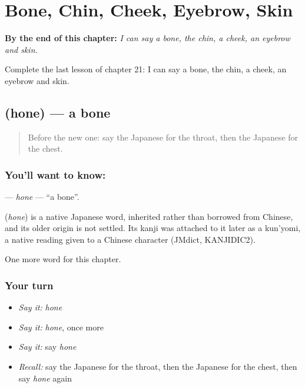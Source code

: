 
\chapter{Bone, Chin, Cheek, Eyebrow, Skin}
\label{ch:ja-bone-chin-cheek-eyebrow-skin}

\begin{chapteropening}
\textbf{By the end of this chapter:} \emph{I can say a bone, the chin, a cheek, an eyebrow and skin.}

Complete the last lesson of chapter 21: I can say a bone, the chin, a cheek, an eyebrow and skin.
\end{chapteropening}

\section[\texorpdfstring{\ja{ほね} (hone)}{ほね (hone)}]{ (hone) — a bone}

\label{lesson:JA-C21-hone}



\begin{quote}
Before the new one: say the Japanese for the throat, then the Japanese for the chest.
\end{quote}

\subsection*{You'll want to know: }
\textbf{} — \emph{hone} — \textquotedblleft{}a bone\textquotedblright{}.

\begin{cousinweb}
\textbf{} (\emph{hone}) is a native Japanese word, inherited rather than borrowed from Chinese, and its older origin is not settled. Its kanji was attached to it later as a kun'yomi, a native reading given to a Chinese character (JMdict, KANJIDIC2).
\end{cousinweb}

\begin{grammarlens}[title={What you've built}]
One more word for this chapter.
\end{grammarlens}

\subsection*{Your turn}
\begin{itemize}
\raggedright
  \item \emph{Say it:} \emph{hone}
  \item \emph{Say it:} \emph{hone}, once more
  \item \emph{Say it:} say \emph{hone}
  \item \emph{Recall:} say the Japanese for the throat, then the Japanese for the chest, then say \emph{hone} again
\end{itemize}

